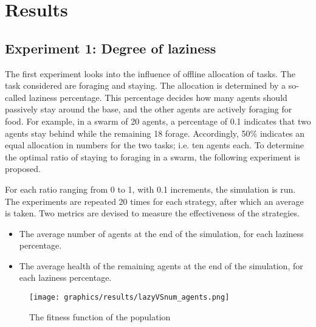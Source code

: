 \section{Results} \label{section:results}
\subsection*{Experiment 1: Degree of laziness}

The first experiment looks into the influence of offline allocation of tasks.
The task considered are foraging and staying.
The allocation is determined by a so-called laziness percentage.
This percentage decides how many agents should passively stay around the base, 
and the other agents are actively foraging for food.
For example, in a swarm of 20 agents, a percentage of 0.1 indicates that two agents stay behind while the remaining 18 forage.
Accordingly, 50\% indicates an equal allocation in numbers for the two tasks; i.e. ten agents each.
To determine the optimal ratio of staying to foraging in a swarm, 
the following experiment is proposed.

For each ratio ranging from 0 to 1, with 0.1 increments, the simulation is run.
The experiments are repeated 20 times for each strategy, after which an average is taken.
Two metrics are devised to measure the effectiveness of the strategies.

\begin{itemize}
    \item The average number of agents at the end of the simulation, for each laziness percentage.
    \item The average health of the remaining agents at the end of the simulation, for each laziness percentage.
\end{itemize}


\textcolor{purple}{
    \blindtext
    \blindtext
}

\begin{figure}[H]
    \centering
    \texttt{[image: graphics/results/lazyVSnum\_agents.png]}
    \caption{The fitness function of the population}
    \label{fig:lazy_vs_num_agents}
\end{figure}

\textcolor{purple}{
    \blindtext
    \blindtext
}

